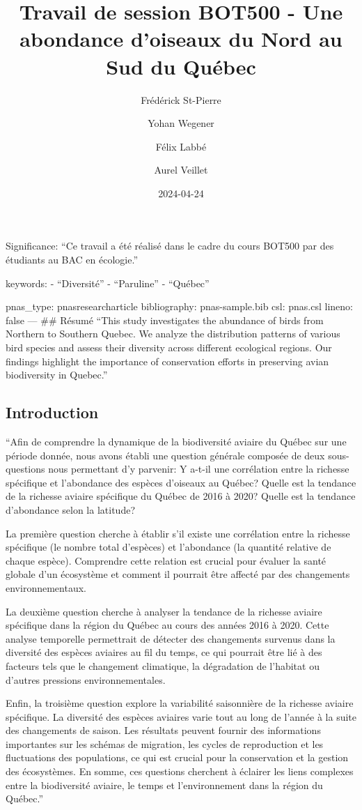 \documentclass[
]{article}
\title{Travail de session BOT500 - Une abondance d'oiseaux du Nord au
Sud du Québec}
\author{Frédérick St-Pierre \and Yohan Wegener \and Félix
Labbé \and Aurel Veillet}
\date{2024-04-24}
\begin{document}
\maketitle

{
\setcounter{tocdepth}{2}
\tableofcontents
}
Significance: ``Ce travail a été réalisé dans le cadre du cours BOT500
par des étudiants au BAC en écologie.''

keywords: - ``Diversité'' - ``Paruline'' - ``Québec''

pnas\_type: pnasresearcharticle bibliography: pnas-sample.bib csl:
pnas.csl lineno: false --- \#\# Résumé ``This study investigates the
abundance of birds from Northern to Southern Quebec. We analyze the
distribution patterns of various bird species and assess their diversity
across different ecological regions. Our findings highlight the
importance of conservation efforts in preserving avian biodiversity in
Quebec.''

\hypertarget{introduction}{%
\subsection{Introduction}\label{introduction}}

``Afin de comprendre la dynamique de la biodiversité aviaire du Québec
sur une période donnée, nous avons établi une question générale composée
de deux sous-questions nous permettant d'y parvenir: Y a-t-il une
corrélation entre la richesse spécifique et l'abondance des espèces
d'oiseaux au Québec? Quelle est la tendance de la richesse aviaire
spécifique du Québec de 2016 à 2020? Quelle est la tendance d'abondance
selon la latitude?

La première question cherche à établir s'il existe une corrélation entre
la richesse spécifique (le nombre total d'espèces) et l'abondance (la
quantité relative de chaque espèce). Comprendre cette relation est
crucial pour évaluer la santé globale d'un écosystème et comment il
pourrait être affecté par des changements environnementaux.

La deuxième question cherche à analyser la tendance de la richesse
aviaire spécifique dans la région du Québec au cours des années 2016 à
2020. Cette analyse temporelle permettrait de détecter des changements
survenus dans la diversité des espèces aviaires au fil du temps, ce qui
pourrait être lié à des facteurs tels que le changement climatique, la
dégradation de l'habitat ou d'autres pressions environnementales.

Enfin, la troisième question explore la variabilité saisonnière de la
richesse aviaire spécifique. La diversité des espèces aviaires varie
tout au long de l'année à la suite des changements de saison. Les
résultats peuvent fournir des informations importantes sur les schémas
de migration, les cycles de reproduction et les fluctuations des
populations, ce qui est crucial pour la conservation et la gestion des
écosystèmes. En somme, ces questions cherchent à éclairer les liens
complexes entre la biodiversité aviaire, le temps et l'environnement
dans la région du Québec.''
\end{document}
